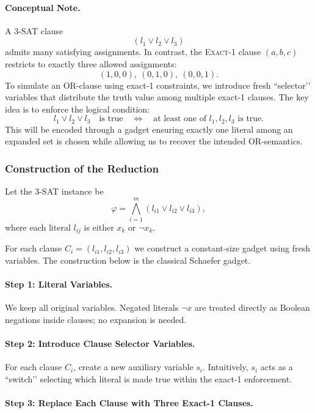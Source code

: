 \documentclass[9pt]{extarticle}
\begin{document}
\paragraph{Conceptual Note.}
A 3-SAT clause 
\[
(l_1 \lor l_2 \lor l_3)
\]
admits many satisfying assignments.  In contrast, the
\textsc{Exact-1} clause $(a,b,c)$ restricts to exactly three allowed assignments:
\[
(1,0,0),\ (0,1,0),\ (0,0,1).
\]
To simulate an OR-clause using exact-1 constraints, we introduce fresh
``selector’’ variables that distribute the truth value among multiple
exact-1 clauses.  The key idea is to enforce the logical condition:
\[
l_1 \lor l_2 \lor l_3 \quad\text{is true} 
\quad\Longleftrightarrow\quad
\text{at least one of } l_1, l_2, l_3 \text{ is true}.
\]
This will be encoded through a gadget ensuring exactly one literal among an
expanded set is chosen while allowing us to recover the intended OR-semantics.

\subsubsection*{Construction of the Reduction}

Let the 3-SAT instance be
\[
\varphi = \bigwedge_{i=1}^m (l_{i1} \lor l_{i2} \lor l_{i3}),
\]
where each literal $l_{ij}$ is either $x_k$ or $\neg x_k$.

For each clause $C_i=(l_{i1},l_{i2},l_{i3})$ we construct a constant-size
gadget using fresh variables.  The construction below is the classical
Schaefer gadget.

\paragraph{Step 1: Literal Variables.}

We keep all original variables.  Negated literals $\neg x$ are treated
directly as Boolean negations inside clauses; no expansion is needed.

\paragraph{Step 2: Introduce Clause Selector Variables.}

For each clause $C_i$, create a new auxiliary variable $s_i$.
Intuitively, $s_i$ acts as a ``switch’’ selecting which literal is made true
within the exact-1 enforcement.

\paragraph{Step 3: Replace Each Clause with Three Exact-1 Clauses.}
\end{document}

